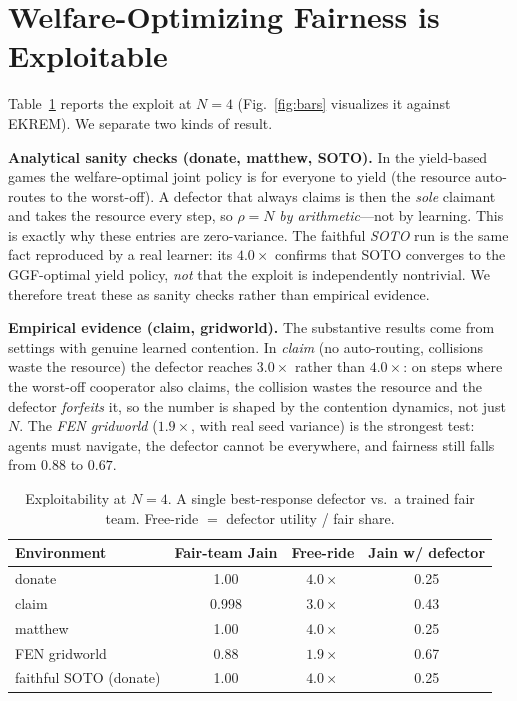 \documentclass[conference, a4paper]{IEEEtran}
\begin{document}
\section{Welfare-Optimizing Fairness is Exploitable}
Table~\ref{tab:exploit} reports the exploit at $N{=}4$ (Fig.~\ref{fig:bars}
visualizes it against EKREM). We separate two kinds of result.

\textbf{Analytical sanity checks (donate, matthew, SOTO).} In the yield-based
games the welfare-optimal joint policy is for everyone to yield (the resource
auto-routes to the worst-off). A defector that always claims is then the
\emph{sole} claimant and takes the resource every step, so $\rho{=}N$ \emph{by
arithmetic}---not by learning. This is exactly why these entries are
zero-variance. The faithful \emph{SOTO} run is the same fact reproduced by a real
learner: its $4.0\times$ confirms that SOTO converges to the GGF-optimal yield
policy, \emph{not} that the exploit is independently nontrivial. We therefore treat
these as sanity checks rather than empirical evidence.

\textbf{Empirical evidence (claim, gridworld).} The substantive results come from
settings with genuine learned contention. In \emph{claim} (no auto-routing,
collisions waste the resource) the defector reaches $3.0\times$ rather than
$4.0\times$: on steps where the worst-off cooperator also claims, the collision
wastes the resource and the defector \emph{forfeits} it, so the number is shaped by
the contention dynamics, not just $N$. The \emph{FEN gridworld} ($1.9\times$, with
real seed variance) is the strongest test: agents must navigate, the defector
cannot be everywhere, and fairness still falls from $0.88$ to $0.67$.

\begin{table}[t]
\caption{Exploitability at $N{=}4$. A single best-response defector vs.\ a trained
fair team. Free-ride $=$ defector utility / fair share.}
\label{tab:exploit}
\centering
\begin{tabular}{lccc}
\toprule
Environment & Fair-team Jain & Free-ride & Jain w/ defector \\
\midrule
donate            & 1.00  & $4.0\times$ & 0.25 \\
claim             & 0.998 & $3.0\times$ & 0.43 \\
matthew           & 1.00  & $4.0\times$ & 0.25 \\
FEN gridworld     & 0.88  & $1.9\times$ & 0.67 \\
\midrule
faithful SOTO (donate) & 1.00 & $4.0\times$ & 0.25 \\
\bottomrule
\end{tabular}
\end{table}
\end{document}
